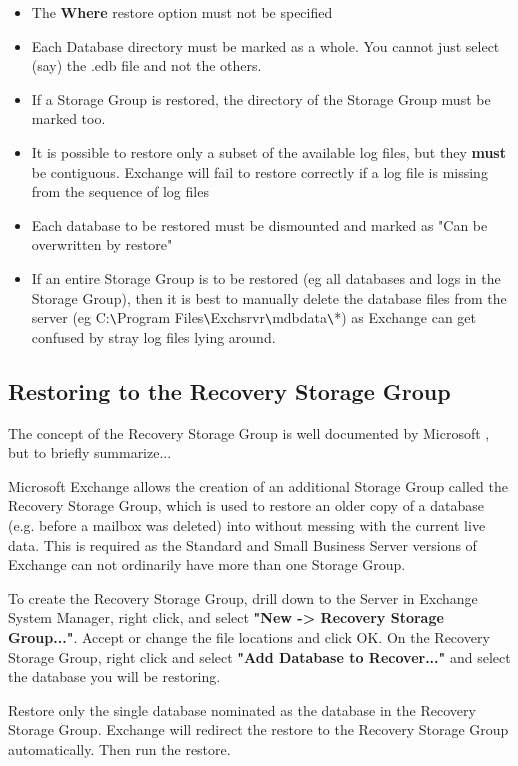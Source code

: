 \begin{itemize}
\item  The {\bf Where} restore option must not be specified
\item Each Database directory must be marked as a whole. You cannot just
     select (say) the .edb file and not the others.
\item If a Storage Group is restored, the directory of the Storage Group
     must be marked too.
\item  It is possible to restore only a subset of the available log files,
     but they {\bf must} be contiguous. Exchange will fail to restore correctly
     if a log file is missing from the sequence of log files
\item Each database to be restored must be dismounted and marked as "Can be
    overwritten by restore"
\item If an entire Storage Group is to be restored (eg all databases and
   logs in the Storage Group), then it is best to manually delete the
   database files from the server (eg C:\verb+\+Program Files\verb+\+Exchsrvr\verb+\+mdbdata\verb+\+*)
   as Exchange can get confused by stray log files lying around.
\end{itemize}

\subsection{Restoring to the Recovery Storage Group}
The concept of the Recovery Storage Group is well documented by
Microsoft 
, 
but to briefly summarize...

Microsoft Exchange allows the creation of an additional Storage Group
called the Recovery Storage Group, which is used to restore an older
copy of a database (e.g. before a mailbox was deleted) into without
messing with the current live data. This is required as the Standard and
Small Business Server versions of Exchange can not ordinarily have more
than one Storage Group.

To create the Recovery Storage Group, drill down to the Server in Exchange
System Manager, right click, and select
{\bf "New -> Recovery Storage Group..."}.  Accept or change the file
locations and click OK. On the Recovery Storage Group, right click and
select {\bf "Add Database to Recover..."} and select the database you will
be restoring.

Restore only the single database nominated as the database in the
Recovery Storage Group. Exchange will redirect the restore to the
Recovery Storage Group automatically.
Then run the restore.

